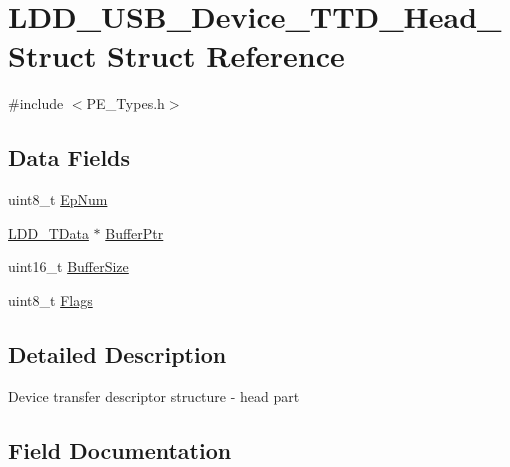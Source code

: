 \hypertarget{struct_l_d_d___u_s_b___device___t_t_d___head___struct}{}\section{L\+D\+D\+\_\+\+U\+S\+B\+\_\+\+Device\+\_\+\+T\+T\+D\+\_\+\+Head\+\_\+\+Struct Struct Reference}
\label{struct_l_d_d___u_s_b___device___t_t_d___head___struct}


{\ttfamily \#include $<$P\+E\+\_\+\+Types.\+h$>$}

\subsection*{Data Fields}
\begin{DoxyCompactItemize}
\item 
uint8\+\_\+t \hyperlink{struct_l_d_d___u_s_b___device___t_t_d___head___struct_ab3874883985b845f4e4be39240793543}{Ep\+Num}
\item 
\hyperlink{group___p_e___types__module_gade8ef9401405bd941b6da738b807f980}{L\+D\+D\+\_\+\+T\+Data} $\ast$ \hyperlink{struct_l_d_d___u_s_b___device___t_t_d___head___struct_aa1830a973aab07b39899cf4435b8aa26}{Buffer\+Ptr}
\item 
uint16\+\_\+t \hyperlink{struct_l_d_d___u_s_b___device___t_t_d___head___struct_ad04ab3cfb7cab97abbba9dfc3c43f1a0}{Buffer\+Size}
\item 
uint8\+\_\+t \hyperlink{struct_l_d_d___u_s_b___device___t_t_d___head___struct_a9572bb866ff1f22ed881f3ff618c0445}{Flags}
\end{DoxyCompactItemize}


\subsection{Detailed Description}
Device transfer descriptor structure -\/ head part 

\subsection{Field Documentation}
\mbox{\label{struct_l_d_d___u_s_b___device___t_t_d___head___struct_aa1830a973aab07b39899cf4435b8aa26}} 

